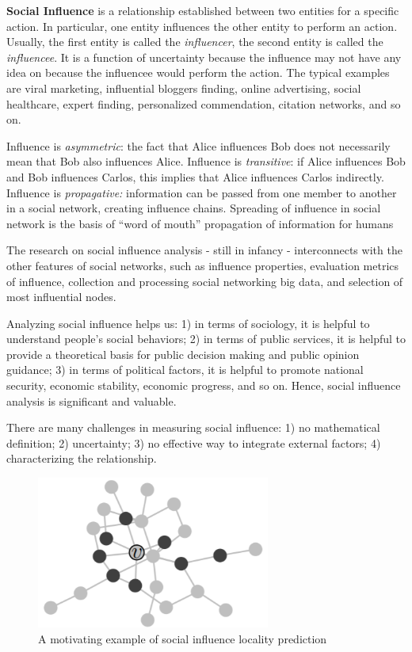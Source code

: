 \textbf{Social Influence} is a relationship established between two entities for a specific action. In particular, one entity influences the other entity to perform an action. Usually, the first entity is called the \textit{influencer}, the second entity is called the \textit{influencee}. It is a function of uncertainty because the influence may not have any idea on because the influencee would perform the action. The typical examples are viral marketing, influential bloggers finding, online advertising, social healthcare, expert finding, personalized commendation, citation networks, and so on.


Influence is \textit{asymmetric}: the fact that Alice influences Bob does not necessarily mean that Bob also influences Alice. Influence is \textit{transitive}: if Alice influences Bob and Bob influences Carlos, this implies that Alice influences Carlos indirectly. Influence is \textit{propagative:} information can be passed from one member to another in a social network, creating influence chains. Spreading of influence in social network is the basis of “word of mouth” propagation of information for humans


The research on social influence analysis - still in infancy - interconnects with the other features of social networks, such as influence properties, evaluation metrics of influence, collection and processing social networking big data, and selection of most influential nodes. 


Analyzing social influence helps us: 1) in terms of sociology, it is helpful to understand people’s social behaviors; 2) in terms of public services, it is helpful to provide a theoretical basis for public decision making and public opinion guidance; 3) in terms of political factors, it is helpful to promote national security, economic stability, economic progress, and so on. Hence, social influence analysis is significant and valuable. 
 

There are many challenges in measuring social influence: 1) no mathematical definition; 2) uncertainty; 3) no effective way to integrate external factors; 4) characterizing the relationship.

\begin{figure}
    \centering
    \includegraphics[height=5cm]{tex/img/social_influencer.png}
    \caption{A motivating example of social influence locality prediction}
    \label{fig:influencer}
\end{figure}

